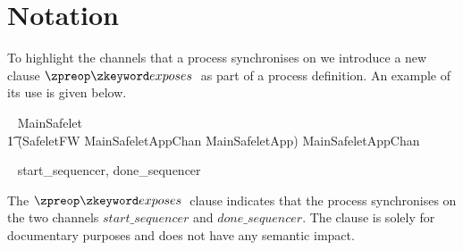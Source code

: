 \section{Notation}

To highlight the channels that a process synchronises on we introduce a new clause $\circexposes$ as part of a process definition. An example of its use is given below.
%
\begin{circusbox}
\nounparsedcolour
\begin{circus*}
  \circprocess ~ MainSafelet ~ \circdef
  \\
  \t1 (SafeletFW \lpar MainSafeletAppChan \rpar MainSafeletApp) \circhide MainSafeletAppChan
\end{circus*}
%
\begin{circus*}
    \circexposes ~ \lchanset start\_sequencer, done\_sequencer \rchanset
\end{circus*}
\end{circusbox}
%
The $\circexposes$ clause indicates that the process synchronises on the two channels $start\_sequencer$ and $done\_sequencer$. The clause is solely for documentary purposes and does not have any semantic impact.
